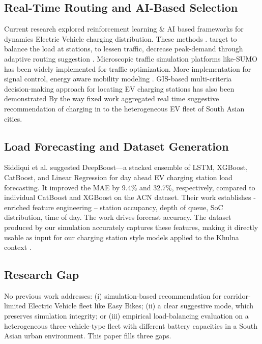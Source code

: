 \documentclass[conference]{IEEEtran}
\begin{document}
\subsection{Real-Time Routing and AI-Based Selection}

Current research explored reinforcement learning \& AI based frameworks
for dynamics Electric Vehicle charging distribution. These methods \cite{b7, b17}.
target to balance the load at stations, to lessen traffic, decrease
peak-demand through adaptive routing suggestion \cite{b12}. Microscopic traffic
simulation platforms like-SUMO has been widely implemented for traffic
optimization. More implementation for signal control, energy aware
mobility modeling \cite{b10, b19}. GIS-based multi-criteria decision-making approach for locating EV charging stations has also been demonstrated \cite{b18} By the way fixed work aggregated real time suggestive
recommendation of charging in to the heterogeneous EV fleet of South
Asian cities.

\subsection{Load Forecasting and Dataset Generation}

Siddiqui et al. \cite{b8} suggested DeepBoost---a stacked ensemble of
LSTM, XGBoost, CatBoost, and Linear Regression for day ahead EV
charging station load forecasting. It improved the MAE by 9.4\% and
32.7\%, respectively, compared to individual CatBoost and XGBoost on
the ACN dataset. Their work establishes - enriched feature engineering
-- station occupancy, depth of queue, SoC distribution, time of day.
The work drives forecast accuracy. The dataset produced by our
simulation accurately captures these features, making it directly
usable as input for our charging station style models applied to the
Khulna context\cite{b9} .

\subsection{Research Gap}

No previous work addresses: (i) simulation-based recommendation for
corridor-limited Electric Vehicle fleet like Easy Bikes; (ii) a clear
suggestive mode, which preserves simulation integrity; or (iii)
empirical load-balancing evaluation on a heterogeneous
three-vehicle-type fleet with different battery capacities in a South
Asian urban environment. This paper fills three gaps.
\end{document}
